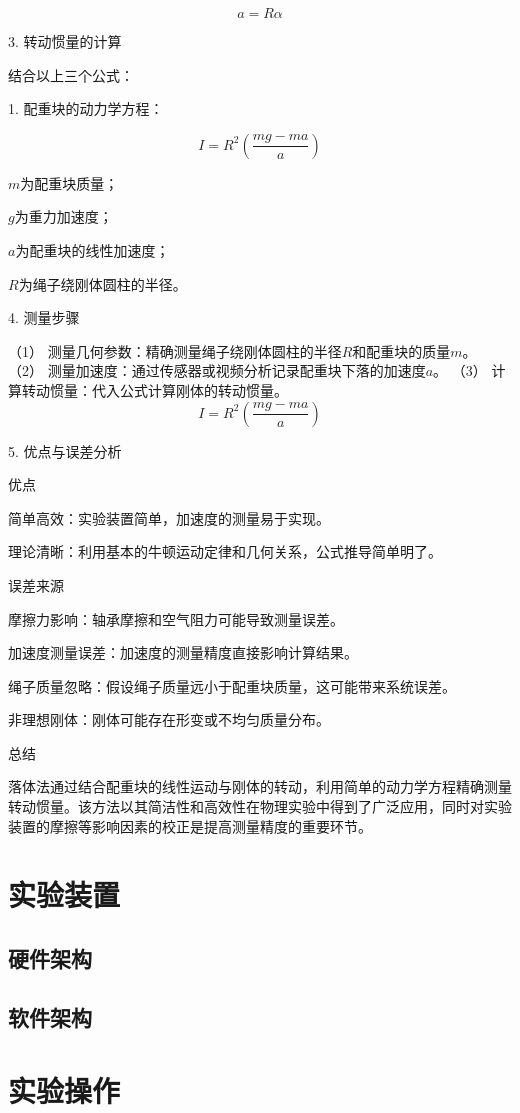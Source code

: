 \documentclass[12pt,hyperref,a4paper,UTF8]{ctexart}
\begin{document}
$$ a = R \alpha $$

3. 转动惯量的计算

结合以上三个公式：

1. 配重块的动力学方程：

$$ I = R^2 \left( \frac{m g - m a}{a} \right) $$

$m$为配重块质量；

$g$为重力加速度；

$a$为配重块的线性加速度；

$R$为绳子绕刚体圆柱的半径。


4. 测量步骤

（1） 测量几何参数：精确测量绳子绕刚体圆柱的半径$R$和配重块的质量$m$。
（2） 测量加速度：通过传感器或视频分析记录配重块下落的加速度$a$。
（3） 计算转动惯量：代入公式计算刚体的转动惯量。
$$ I=R^2(\frac{mg-ma}{a}) $$


5. 优点与误差分析

优点

简单高效：实验装置简单，加速度的测量易于实现。

理论清晰：利用基本的牛顿运动定律和几何关系，公式推导简单明了。


误差来源

摩擦力影响：轴承摩擦和空气阻力可能导致测量误差。

加速度测量误差：加速度的测量精度直接影响计算结果。

绳子质量忽略：假设绳子质量远小于配重块质量，这可能带来系统误差。

非理想刚体：刚体可能存在形变或不均匀质量分布。


总结

落体法通过结合配重块的线性运动与刚体的转动，利用简单的动力学方程精确测量转动惯量。该方法以其简洁性和高效性在物理实验中得到了广泛应用，同时对实验装置的摩擦等影响因素的校正是提高测量精度的重要环节。


\section{实验装置}
\subsection{硬件架构}


\subsection{软件架构}



\section{实验操作}
\end{document}
